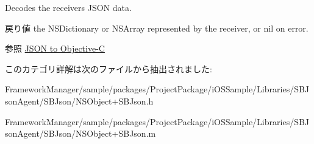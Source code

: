 Decodes the receiver\textquotesingle{}s J\+S\+O\+N data. 

\begin{DoxyReturn}{戻り値}
the N\+S\+Dictionary or N\+S\+Array represented by the receiver, or nil on error.
\end{DoxyReturn}
\begin{DoxySeeAlso}{参照}
\hyperlink{json2objc}{J\+S\+O\+N to Objective-\/\+C} 
\end{DoxySeeAlso}


このカテゴリ詳解は次のファイルから抽出されました\+:\begin{DoxyCompactItemize}
\item 
Framework\+Manager/sample/packages/\+Project\+Package/i\+O\+S\+Sample/\+Libraries/\+S\+B\+Json\+Agent/\+S\+B\+Json/N\+S\+Object+\+S\+B\+Json.\+h\item 
Framework\+Manager/sample/packages/\+Project\+Package/i\+O\+S\+Sample/\+Libraries/\+S\+B\+Json\+Agent/\+S\+B\+Json/N\+S\+Object+\+S\+B\+Json.\+m\end{DoxyCompactItemize}
